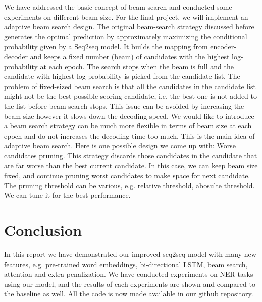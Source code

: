 \documentclass[11pt,a4paper]{article}
\begin{document}
We have addressed the basic concept of beam search and conducted some experiments on different beam size. For the final project, we will implement an adaptive beam search design. The original beam-search strategy discussed before generates the optimal prediction by approximately maximizing the conditional probability given by a Seq2seq model.  It builds the mapping from encoder-decoder and keeps a fixed number (beam) of candidates with the highest log-probability at each epoch. The search stops when the beam is full and the candidate with highest log-probability is picked from the candidate list. The problem of fixed-sized beam search is that all the candidates in the candidate list might not be the best possible scoring candidate, i.e. the best one is not added to the list before beam search stops. This issue can be avoided by increasing the beam size however it slows down the decoding speed. We would like to introduce a beam search strategy can be much more flexible in terms of beam size at each epoch and do not increases the decoding time too much. This is the main idea of adaptive beam search. Here is one possible design we come up with: Worse candidates pruning. This strategy discards those candidates in the candidate that are far worse than the best current candidate. In this case, we can keep beam size fixed, and continue pruning worst candidates to make space for next candidate. The pruning threshold can be various, e.g. relative threshold, abosulte threshold. We can tune it for the best performance. 

\section{Conclusion} \label{sec:conclusion}
In this report we have demonstrated our improved seq2seq model with many new features, e.g. pre-trained word embeddings, bi-directional LSTM, beam search, attention and extra penalization. We have conducted experiments on NER tasks using our model, and the results of each experiments are shown and compared to the baseline as well. All the code is now made available in our github repository. 




\end{document}
